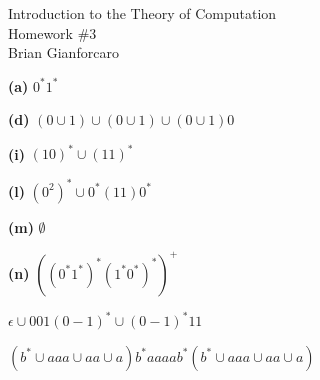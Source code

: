 \documentclass[11pt]{article}
\newcommand{\question}[2] {\vspace{.25in} \fbox{#1} #2 \vspace{.10in}}
\renewcommand{\part}[1] {\vspace{.10in} {\bf (#1)}}
\begin{document}
\medskip                        %


\begin{center}                  %
  {\Large Introduction to the Theory of Computation \\ Homework \#3} \\
  Brian Gianforcaro \\
  \date \\
\end{center}

\ttfamily

\question{1}{}

\part{a}
   $0^{*}1^{*}$  

\part{d}
   $(0 \cup 1) \cup (0 \cup 1) \cup (0 \cup 1)0$  

\part{i}
   $(10)^{*}\cup(11)^{*}$  


\part{l}
   $(0^{2})^{*}\cup{0}^{*}(11){0}^{*}$  


\part{m}
 $\emptyset$


\part{n}
   $((0^{*}{1}^{*})^{*}(1^{*}{0}^{*})^{*})^{+} $ 


\question{2}{}

   ${\epsilon} {\cup} 001(0-1)^{*}{\cup}(0-1)^{*}11$  

\question{3}{}

   $({b}^{*} \cup aaa \cup aa \cup a ){b}^{*}aaaa{b}^{*}({b}^{*} \cup aaa \cup aa \cup a )$  
\end{document}
